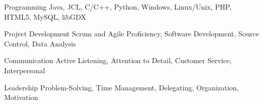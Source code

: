 \begin{cvskills}
  \cvskill
    {Programming} %
    {Java, JCL, C/C++, Python, Windows, Linux/Unix, PHP, HTML5, MySQL, libGDX} %
    
  \cvskill
    {Project Development} %
    {Scrum and Agile Proficiency, Software Development, Source Control, Data Analysis} %
    
  \cvskill
    {Communication} %
    {Active Listening, Attention to Detail, Customer Service, Interpersonal} %
    
  \cvskill
    {Leadership} %
    {Problem-Solving, Time Management, Delegating, Organization, Motivation} %
    
\end{cvskills}
